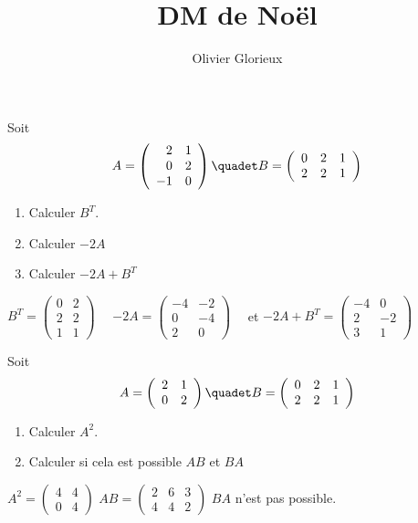 \documentclass[a4paper, 11pt,reqno]{article}
\author{Olivier Glorieux}
\begin{document}
\title{DM de Noël 
}

\begin{exercice}
Soit $$A=\left(\begin{array}{rr} 2&1\\0&2\\-1&0 \end{array}\right) \quadet B=\left(\begin{array}{rrr} 0&2&1\\2&2&1 \end{array}\right)$$
\begin{enumerate}
\item Calculer $B^T$.
\item Calculer $-2A$
\item Calculer $-2A+B^T$
\end{enumerate}
\end{exercice}
\begin{correction}

$B^T = \left(\begin{array}{rrr} 0&2\\2&2\\1&1 \end{array}\right)\quad $
$-2A=\left(\begin{array}{rr} -4&-2\\0&-4\\2&0 \end{array}\right)\quad $ et 
$-2A+B^T=\left(\begin{array}{rr} -4&0\\2&-2\\3&1 \end{array}\right)$

\end{correction}


\begin{exercice}
Soit $$A=\left(\begin{array}{rr} 2&1\\0&2 \end{array}\right) \quadet B=\left(\begin{array}{rrr} 0&2&1\\2&2&1 \end{array}\right)$$
\begin{enumerate}
\item Calculer $A^2$.
\item Calculer si cela est possible $AB$ et $BA$
\end{enumerate}
\end{exercice}
\begin{correction}
$A^2=\left(\begin{array}{rr} 4&4\\0&4 \end{array}\right) $ 
$AB= \left(\begin{array}{rrr} 2&6&3\\4&4&2 \end{array}\right)$
$BA$ n'est pas possible. 
\end{correction}
\end{document}
